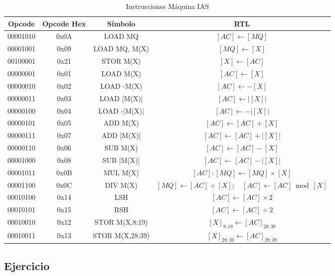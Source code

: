 \documentclass{article}
\begin{document}
\begin{table}[htbp]
  \caption{Instrucciones Máquina IAS}
  \label{tab:tablaISA-IAS}
  \centering
  \begin{tabular}{|cccc|}
    \hline
    Opcode   & Opcode Hex &  Símbolo          & RTL \\ \hline
    00001010 & 0x0A       &  LOAD MQ          & $[AC]\leftarrow[MQ]$\\
    00001001 & 0x09       &  LOAD MQ, M(X)    & $[MQ]\leftarrow[X]$\\
    00100001 & 0x21       &  STOR M(X)        & $[X]\leftarrow[AC]$\\
    00000001 & 0x01       &  LOAD M(X)        & $[AC]\leftarrow[X]$\\
    00000010 & 0x02 	  &  LOAD -M(X)       & $[AC]\leftarrow-[X]$\\
    00000011 & 0x03       &  LOAD |M(X)|      & $[AC]\leftarrow|[X]|$\\
    00000100 & 0x04       &  LOAD -|M(X)|     & $[AC]\leftarrow-|[X]|$\\
    00000101 & 0x05	  &  ADD M(X)	      & $[AC]\leftarrow[AC]+[X]$\\
    00000111 & 0x07       &  ADD |M(X)|       & $[AC]\leftarrow[AC]+|[X]|$\\
    00000110 & 0x06       &  SUB M(X)         & $[AC]\leftarrow[AC]-[X]$\\
    00001000 & 0x08       &  SUB |M(X)|       & $[AC]\leftarrow[AC]-|[X]|$\\
    00001011 & 0x0B       &  MUL M(X)         & $[AC]:[MQ]\leftarrow[MQ]\times[X]$\\
    00001100 & 0x0C       &  DIV M(X)         & $[MQ]\leftarrow[AC]\div[X];\quad[AC]\leftarrow[AC]\bmod[X]$\\
    00010100 & 0x14       &  LSH	      & $[AC]\leftarrow[AC]\times2$\\
    00010101 & 0x15       &  RSH              & $[AC]\leftarrow[AC]\div2$\\
    00010010 & 0x12       &  STOR M(X,8:19)   & $[X]_{8:19} \leftarrow[AC]_{28:39}$\\
    00010011 & 0x13       &  STOR M(X,28:39)  & $[X]_{28:39}\leftarrow[AC]_{28:39}$\\    
    \hline
  \end{tabular}
\end{table}

\newpage

\subsection{Ejercicio}
\label{sec:orgd90cec5}
\label{sec:org2996c8c}
\end{document}
